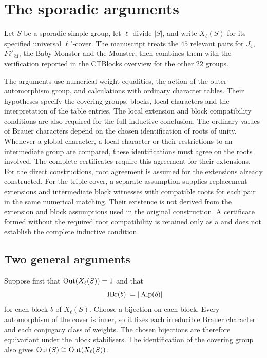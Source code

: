 \chapter{The sporadic arguments}
\label{chap:current-sporadic}

Let $S$ be a sporadic simple group, let $\ell$ divide $|S|$, and write
$X_\ell(S)$ for its specified universal $\ell'$-cover. The manuscript treats
the $45$ relevant pairs for $J_4$, $Fi'_{24}$, the Baby Monster and the
Monster, then combines them with the verification reported in the CTBlocks
overview for the other $22$ groups.

The arguments use numerical weight equalities, the action of the outer
automorphism group, and calculations with ordinary character tables. Their
hypotheses specify the covering groups, blocks, local characters and the
interpretation of the table entries. The local extension and block
compatibility conditions are also required for the full inductive
conclusion. The ordinary values of Brauer characters depend on
the chosen identification of roots of unity. Whenever a global character,
a local character or their restrictions to an intermediate group are
compared, these identifications must agree on the roots involved.
The complete certificates require this agreement for their extensions.
For the direct constructions, root agreement is assumed for the extensions
already constructed. For the triple cover, a separate assumption supplies
replacement extensions and intermediate block witnesses with compatible
roots for each pair in the same numerical matching. Their existence is not derived from the extension and block assumptions used in the original construction. A certificate formed without
the required root compatibility is retained
only as a  and does not establish the
complete inductive condition.

\section{Two general arguments}

Suppose first that $\operatorname{Out}(X_\ell(S))=1$ and that
\[
 |\operatorname{IBr}(b)|=|\operatorname{Alp}(b)|
\]
for each block $b$ of $X_\ell(S)$. Choose a bijection on each block.
Every automorphism of the cover is inner, so it fixes each irreducible
Brauer character and each conjugacy class of weights. The chosen
bijections are therefore equivariant under the block stabilisers.
The identification of the covering group also gives
$\operatorname{Out}(S)\cong\operatorname{Out}(X_\ell(S))$.

